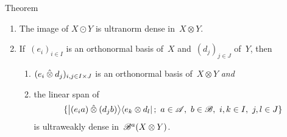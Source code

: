 \documentclass[b]{subfiles}
\begin{document}
\begin{parsec}
\begin{point}{Theorem}
\begin{enumerate}
    \item The image of $X \odot Y$ is ultranorm dense in~$X \otimes Y$.
    \item If~$(e_i)_{i \in I}$ is an orthonormal basis of~$X$
                and~$(d_j)_{j \in J}$ of~$Y$,
                then
        \begin{enumerate}
            \item $(e_i \mathbin{\hat{\otimes}} d_j)_{i,j\in I\times J}$
                is an orthonormal basis of~$X \otimes Y$ \emph{and}
            \item
                the linear span of
                \begin{equation*}
                    \{ \ketbra{(e_i a) \hotimes (d_j b)}{
                        e_{k}\otimes d_{l} }; \ 
                        a \in \scrA, \ 
                        b \in \scrB,\ 
                        i,k \in I,\ 
                        j,l \in J
                    \} 
                \end{equation*}
                is ultraweakly dense in~$\mathscr{B}^a(X \otimes Y)$.
        \end{enumerate}
                

\end{enumerate}
\end{point}
\end{parsec}
\end{document}
